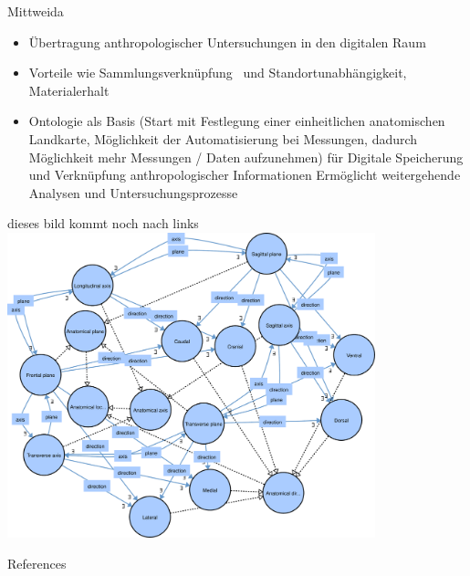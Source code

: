 \documentclass[portrait,final,a0paper,fontscale=0.320]{imiseposter}
\begin{document}
\begin{poster}
\begin{posterbox}[name=results,column=1]{Mittweida}
\begin{itemize}
\item Übertragung anthropologischer Untersuchungen in den digitalen Raum~\cite{digitalisierung}
\item Vorteile wie Sammlungsverknüpfung~\cite{spurensuche} und Standortunabhängigkeit, Materialerhalt 
\item Ontologie als Basis (Start mit Festlegung einer einheitlichen anatomischen Landkarte, Möglichkeit der Automatisierung bei Messungen, dadurch Möglichkeit mehr Messungen / Daten aufzunehmen) für Digitale Speicherung und Verknüpfung anthropologischer Informationen 
Ermöglicht weitergehende Analysen und Untersuchungsprozesse 
\end{itemize}
dieses bild kommt noch nach links\\
\includegraphics[width=0.8\textwidth]{img/location.pdf}
\end{posterbox}
\begin{posterbox}[name=references,column=0,below=ontology]{References}
    \small
\begingroup
    \renewcommand{\section}[2]{}%
    
    

\end{posterbox}
\end{poster}
\end{document}
